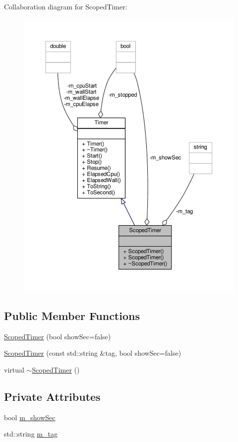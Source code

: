 Collaboration diagram for Scoped\-Timer\-:
\nopagebreak
\begin{figure}[H]
\begin{center}
\leavevmode
\includegraphics[width=350pt]{classScopedTimer__coll__graph}
\end{center}
\end{figure}
\subsection*{Public Member Functions}
\begin{DoxyCompactItemize}
\item 
\hyperlink{classScopedTimer_a2536d4f1b6b6b2aeff9c129689d6cad4}{Scoped\-Timer} (bool show\-Sec=false)
\item 
\hyperlink{classScopedTimer_ae6f9abc80951eb5b27a6761d67dddf8d}{Scoped\-Timer} (const std\-::string \&tag, bool show\-Sec=false)
\item 
virtual \hyperlink{classScopedTimer_a338ced0c8c39fe3d3e89e1b09d29f589}{$\sim$\-Scoped\-Timer} ()
\end{DoxyCompactItemize}
\subsection*{Private Attributes}
\begin{DoxyCompactItemize}
\item 
bool \hyperlink{classScopedTimer_a644085f13d45fff670f04fd7b4eea467}{m\-\_\-show\-Sec}
\item 
std\-::string \hyperlink{classScopedTimer_a2ce039c0c54f703ff547cfbb60f02409}{m\-\_\-tag}
\end{DoxyCompactItemize}


